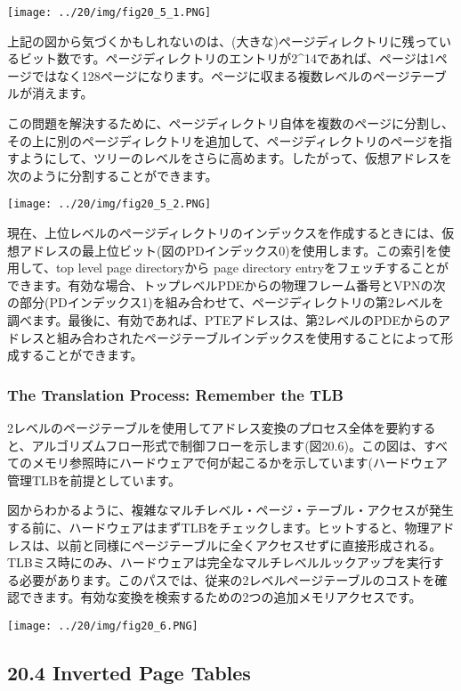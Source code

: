 \texttt{[image: ../20/img/fig20\_5\_1.PNG]}

上記の図から気づくかもしれないのは、(大きな)ページディレクトリに残っているビット数です。ページディレクトリのエントリが2\^{}14であれば、ページは1ページではなく128ページになります。ページに収まる複数レベルのページテーブルが消えます。

この問題を解決するために、ページディレクトリ自体を複数のページに分割し、その上に別のページディレクトリを追加して、ページディレクトリのページを指すようにして、ツリーのレベルをさらに高めます。したがって、仮想アドレスを次のように分割することができます。

\texttt{[image: ../20/img/fig20\_5\_2.PNG]}

現在、上位レベルのページディレクトリのインデックスを作成するときには、仮想アドレスの最上位ビット(図のPDインデックス0)を使用します。この索引を使用して、top
level page directoryから page directory
entryをフェッチすることができます。有効な場合、トップレベルPDEからの物理フレーム番号とVPNの次の部分(PDインデックス1)を組み合わせて、ページディレクトリの第2レベルを調べます。最後に、有効であれば、PTEアドレスは、第2レベルのPDEからのアドレスと組み合わされたページテーブルインデックスを使用することによって形成することができます。

\hypertarget{the-translation-process-remember-the-tlb}{%
\subsubsection*{The Translation Process: Remember the
TLB}\label{the-translation-process-remember-the-tlb}}

2レベルのページテーブルを使用してアドレス変換のプロセス全体を要約すると、アルゴリズムフロー形式で制御フローを示します(図20.6)。この図は、すべてのメモリ参照時にハードウェアで何が起こるかを示しています(ハードウェア管理TLBを前提としています。

図からわかるように、複雑なマルチレベル・ページ・テーブル・アクセスが発生する前に、ハードウェアはまずTLBをチェックします。ヒットすると、物理アドレスは、以前と同様にページテーブルに全くアクセスせずに直接形成される。TLBミス時にのみ、ハードウェアは完全なマルチレベルルックアップを実行する必要があります。このパスでは、従来の2レベルページテーブルのコストを確認できます。有効な変換を検索するための2つの追加メモリアクセスです。

\texttt{[image: ../20/img/fig20\_6.PNG]}

\hypertarget{inverted-page-tables}{%
\subsection*{20.4 Inverted Page Tables}\label{inverted-page-tables}}

